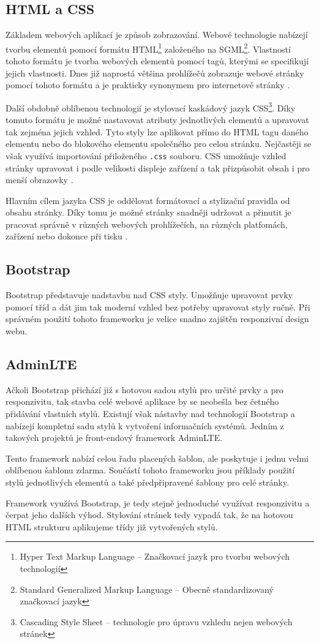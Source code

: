 \documentclass[czech,BP]{thesiskiv}
\begin{document}
	\subsection{HTML a CSS}
		\par Základem webových aplikací je způsob zobrazování. Webové technologie nabízejí tvorbu elementů pomocí formátu HTML\footnote{Hyper Text Markup Language -- Značkovací jazyk pro tvorbu webových technologií} založeného na SGML\footnote{Standard Generalized Markup Language -- Obecně standardizovaný značkovací jazyk}. Vlastností tohoto formátu je tvorba webových elementů pomocí tagů, kterými se specifikují jejich vlastnosti. Dnes již naprostá většina prohlížečů zobrazuje webové stránky pomocí tohoto formátu a je prakticky synonymem pro internetové stránky \cite{HTML5aCSS3}.
		\par Další obdobně oblíbenou technologií je stylovací kaskádový jazyk CSS\footnote{Cascading Style Sheet -- technologie pro úpravu vzhledu nejen webových stránek}. Díky tomuto formátu je možné nastavovat atributy jednotlivých elementů a upravovat tak zejména jejich vzhled. Tyto styly lze aplikovat přímo do HTML tagu daného elementu nebo do blokového elementu společného pro celou stránku. Nejčastěji se však využívá importování přiloženého \texttt{.css} souboru. CSS umožňuje vzhled stránky upravovat i podle velikosti displeje zařízení a tak přizpůsobit obsah i pro menší obrazovky \cite{CSSOkamzite}.
		\par Hlavním cílem jazyka CSS je oddělovat formátovací a stylizační pravidla od obsahu stránky. Díky tomu je možné stránky snadněji udržovat a přinutit je pracovat správně v různých webových prohlížečích, na různých platfomách, zařízení nebo dokonce při tisku \cite{HTML5aCSS3}.
	\subsection{Bootstrap}
		\par Bootstrap představuje nadstavbu nad CSS styly. Umožňuje upravovat prvky pomocí tříd a dát jim tak moderní vzhled bez potřeby upravovat styly ručně. Při správném použití tohoto frameworku je velice snadno zajištěn responzivní design webu.
	\subsection{AdminLTE}
		Ačkoli Bootstrap přichází již s hotovou sadou stylů pro určité prvky a pro responzivitu, tak stavba celé webové aplikace by se neobešla bez četného přidávání vlastních stylů. Existují však nástavby nad technologií Bootstrap a nabízejí kompletní sadu stylů k vytvoření informačních systémů. Jedním z takových projektů je front-endový framework AdminLTE. 
		\par Tento framework nabízí celou řadu placených šablon, ale poskytuje i jednu velmi oblíbenou šablonu zdarma. Součástí tohoto frameworku jsou příklady použití stylů jednotlivých elementů a také předpřipravené šablony pro celé stránky.
		\par Framework využívá Bootstrap, je tedy stejně jednoduché využívat responzivitu a čerpat jeho dalších výhod. Stylování stránek tedy vypadá tak, že na hotovou HTML strukturu aplikujeme třídy již vytvořených stylů.
\end{document}
